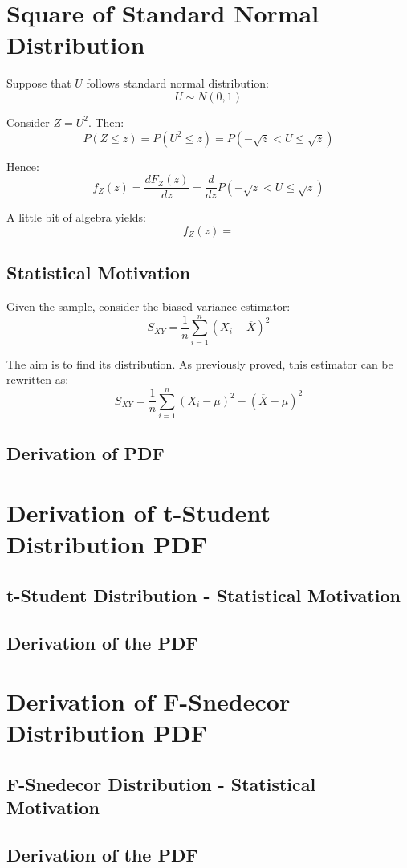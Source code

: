 \documentclass[12pt]{article}
\begin{document}
\section{Square of Standard Normal Distribution}
Suppose that $U$ follows standard normal distribution:
\begin{equation*}
U \sim N(0, 1)
\end{equation*}

Consider $Z = U^2$. Then:
\begin{equation*}
P(Z \leq z) = P(U^2 \leq z) = P(-\sqrt{z} < U \leq \sqrt{z})
\end{equation*}

Hence:
\begin{equation*}
f_{Z}(z) = \frac{dF_{Z}(z)}{dz} = \frac{d}{dz} P(-\sqrt{z} < U \leq \sqrt{z})
\end{equation*}

A little bit of algebra yields:
\begin{equation*}
f_{Z}(z) = 
\end{equation*}



\subsection{Statistical Motivation}
Given the sample, consider the biased variance estimator:
\begin{equation*}
S_{XY} = \frac{1}{n} \sum_{i=1}^{n} (X_i - \overline{X})^2 
\end{equation*}

The aim is to find its distribution. As previously proved, this estimator can be rewritten as:
\begin{equation*}
S_{XY} = \frac{1}{n} \sum_{i=1}^{n} (X_i - \mu)^2 - (\overline{X} - \mu)^2
\end{equation*}


\subsection{Derivation of PDF}

\section{Derivation of t-Student Distribution PDF}
\subsection{t-Student Distribution - Statistical Motivation}

\subsection{Derivation of the PDF}

\section{Derivation of F-Snedecor Distribution PDF}
\subsection{F-Snedecor Distribution - Statistical Motivation}
\subsection{Derivation of the PDF}



\end{document}
